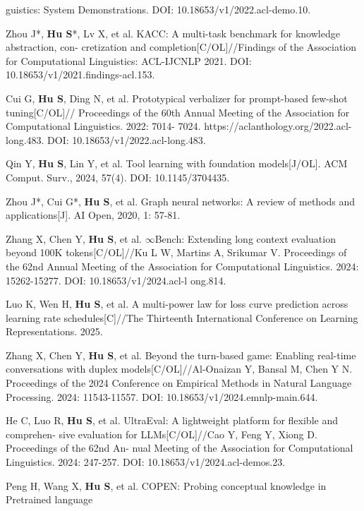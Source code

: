 \begin{resume}
\begin{achievements}
      guistics: System Demonstrations. DOI: 10.18653/v1/2022.acl-demo.10.
      \item Zhou J*, \textbf{Hu S}*, Lv X, et al. KACC: A multi-task benchmark for knowledge abstraction, con-
      cretization and completion[C/OL]//Findings of the Association for Computational Linguistics:
      ACL-IJCNLP 2021. DOI: 10.18653/v1/2021.findings-acl.153.
      \item Cui G, \textbf{Hu S}, Ding N, et al. Prototypical verbalizer for prompt-based few-shot tuning[C/OL]//
      Proceedings of the 60th Annual Meeting of the Association for Computational Linguistics. 2022: 7014-
      7024. https://aclanthology.org/2022.acl-long.483. DOI: 10.18653/v1/2022.acl-long.483.
      \item Qin Y, \textbf{Hu S}, Lin Y, et al. Tool learning with foundation models[J/OL]. ACM Comput. Surv.,
      2024, 57(4). DOI: 10.1145/3704435.
      \item Zhou J*, Cui G*, \textbf{Hu S}, et al. Graph neural networks: A review of methods and applications[J].
      AI Open, 2020, 1: 57-81.
      \item Zhang X, Chen Y, \textbf{Hu S}, et al. $\infty$Bench: Extending long context evaluation beyond 100K
      tokens[C/OL]//Ku L W, Martins A, Srikumar V. Proceedings of the 62nd Annual Meeting of
      the Association for Computational Linguistics. 2024: 15262-15277. DOI: 10.18653/v1/2024.acl-l
      ong.814.
      \item Luo K, Wen H, \textbf{Hu S}, et al. A multi-power law for loss curve prediction across learning rate
      schedules[C]//The Thirteenth International Conference on Learning Representations. 2025.
      \item Zhang X, Chen Y, \textbf{Hu S}, et al. Beyond the turn-based game: Enabling real-time conversations
      with duplex models[C/OL]//Al-Onaizan Y, Bansal M, Chen Y N. Proceedings of the 2024
      Conference on Empirical Methods in Natural Language Processing. 2024: 11543-11557. DOI: 10.18653/v1/2024.emnlp-main.644.
      \item He C, Luo R, \textbf{Hu S}, et al. UltraEval: A lightweight platform for flexible and comprehen-
      sive evaluation for LLMs[C/OL]//Cao Y, Feng Y, Xiong D. Proceedings of the 62nd An-
      nual Meeting of the Association for Computational Linguistics. 2024: 247-257. DOI: 10.18653/v1/2024.acl-demos.23.
      \item Peng H, Wang X, \textbf{Hu S}, et al. COPEN: Probing conceptual knowledge in Pretrained language

\end{achievements}
\end{resume}
